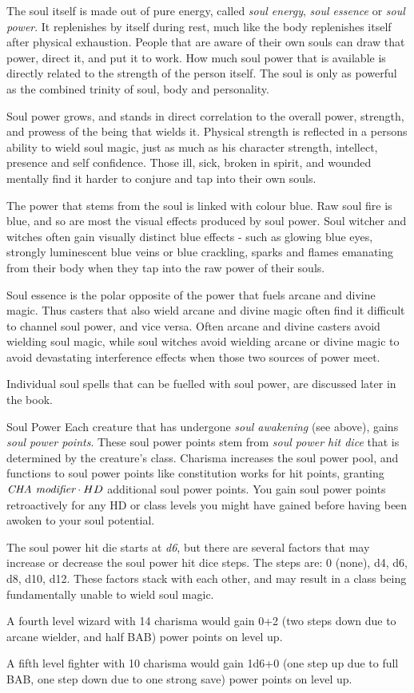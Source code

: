 The soul itself is made out of pure energy, called \emph{soul energy},
\emph{soul essence} or \emph{soul power}. It replenishes by itself during rest,
much like the body replenishes itself after physical exhaustion. People that
are aware of their own souls can draw that power, direct it, and put it to
work. How much soul power that is available is directly related to the
strength of the person itself. The soul is only as powerful as the combined
trinity of soul, body and personality.

Soul power grows, and stands in direct correlation to the overall power,
strength, and prowess of the being that wields it. Physical strength is
reflected in a persons ability to wield soul magic, just as much as his
character strength, intellect, presence and self confidence. Those ill, sick,
broken in spirit, and wounded mentally find it harder to conjure and tap into
their own souls.

The power that stems from the soul is linked with colour blue. Raw soul fire
is blue, and so are most the visual effects produced by soul power. Soul
witcher and witches often gain visually distinct blue effects - such as
glowing blue eyes, strongly luminescent blue veins or blue crackling, sparks
and flames emanating from their body when they tap into the raw power of
their souls.

Soul essence is the polar opposite of the power that fuels arcane and divine
magic. Thus casters that also wield arcane and divine magic often find it
difficult to channel soul power, and vice versa. Often arcane and divine
casters avoid wielding soul magic, while soul witches avoid wielding arcane or
divine magic to avoid devastating interference effects when those two sources
of power meet.

Individual soul spells that can be fuelled with soul power, are discussed
later in the book.

\begin{35e}{Soul Power}
  Each creature that has undergone \emph{soul awakening} (see above),
  gains \emph{soul power points}. These soul power points stem from \emph{
  soul power hit dice} that is determined by the creature's class.
  Charisma increases the soul power pool, and functions to soul power
  points like constitution works for hit points, granting $ \emph{CHA
  modifier} \cdot HD $ additional soul power points. You gain soul power
  points retroactively for any HD or class levels you might have gained
  before having been awoken to your soul potential.

  The soul power hit die starts at \emph{d6}, but there are several factors
  that may increase or decrease the soul power hit dice steps. The steps are:
  0 (none), d4, d6, d8, d10, d12. These factors stack with each other, and may
  result in a class being fundamentally unable to wield soul magic.

  A fourth level wizard with 14 charisma would gain 0+2 (two steps down due to
  arcane wielder, and half BAB) power points on level up.

  A fifth level fighter with 10 charisma would gain 1d6+0 (one step up due to
  full BAB, one step down due to one strong save) power points on level up.
\end{35e}

